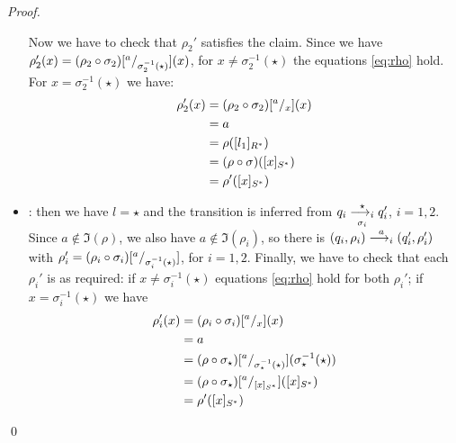 \begin{proof}
\begin{itemize}
\begin{itemize}
	\end{itemize}
	Now we have to check that $\rho_2'$ satisfies the claim. Since we have $\rho'_2(x) = (\rho_2 \circ \sigma_2)[{}^{a}/_{\sigma_2^{-1}(\star)}](x)$, for $x \neq \sigma_2^{-1}(\star)$ the equations \eqref{eq:rho} hold. For $x =  \sigma_2^{-1}(\star)$ we have:
	\begin{align*}
		\rho'_2(x) &= (\rho_2 \circ \sigma_2)[{}^{a}/_{x}](x) \\
		&= a \\
		&= \rho([l_1]_{R^*}) \\
		&= (\rho \circ \sigma)([x]_{S^*}) \\
		& = \rho'([x]_{S^*})
	\end{align*}	


	\item \allrule: then we have $l=\star$ and the transition is inferred from $q_i \overset{\star}{\underset{\sigma_i}{\longrightarrow_{i}}} q_i'$, $i=1,2$. Since $a \notin \Im(\rho)$, we also have $a \notin \Im(\rho_i)$, so there is $(q_i,\rho_i) \overset{a}{\longrightarrow_{i}} (q_i',\rho_i')$ with $\rho_i' = (\rho_i \circ \sigma_i)[{}^{a}/_{\sigma^{-1}_i(\star)}]$, for $i=1,2$. Finally, we have to check that each $\rho_i'$ is as required: if $x \neq\sigma_i^{-1}(\star)$ equations \eqref{eq:rho} hold for both $\rho_i'$; if $x=\sigma_i^{-1}(\star)$ we have
	\begin{align*}
		\rho'_i(x) &= (\rho_i \circ \sigma_i)[{}^{a}/_{x}](x) \\
		&= a \\
		&= (\rho \circ \sigma_\star) [{}^{a}/_{\sigma_\star^{-1}(\star)}](\sigma_\star^{-1}(\star)) \\
		&= (\rho \circ \sigma_\star) [{}^{a}/_{[x]_{S^*}}]([x]_{S^*}) \\
		&= \rho'([x]_{S^*})
	\end{align*}
	
\end{itemize} 
\qed
\end{proof}




